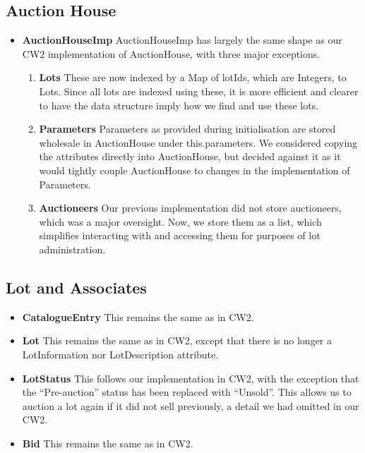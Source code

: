\documentclass[titlepage, 12pt]{extarticle}
\begin{document}
\subsection{Auction House}
\begin{itemize}
    \item {\bf AuctionHouseImp} AuctionHouseImp has largely the same shape as
        our CW2 implementation of AuctionHouse, with three major exceptions.
        \begin{enumerate}
            \item {\bf Lots} These are now indexed by a Map of lotIds, which are
                Integers, to Lots. Since all lots are indexed using these, it is
                more efficient and clearer to have the data structure imply how
                we find and use these lots.
            \item {\bf Parameters} Parameters as provided during initialisation
                are stored wholesale in AuctionHouse under this.parameters. We
                considered copying the attributes directly into AuctionHouse,
                but decided against it as it would tightly couple AuctionHouse
                to changes in the implementation of Parameters.
            \item {\bf Auctioneers} Our previous implementation did not store
                auctioneers, which was a major oversight. Now, we store them as
                a list, which simplifies interacting with and accessing them for
                purposes of lot administration.
        \end{enumerate}
\end{itemize}
\subsection{Lot and Associates}
\begin{itemize}
    \item {\bf CatalogueEntry} This remains the same as in CW2.
    \item {\bf Lot} This remains the same as in CW2, except that there is no
        longer a LotInformation nor LotDescription attribute. 
    \item {\bf LotStatus} This follows our implementation in CW2, with the
        exception that the ``Pre-auction'' status has been replaced with
        ``Unsold''. This allows us to auction a lot again if it did not sell
        previously, a detail we had omitted in our CW2. 
    \item {\bf Bid} This remains the same as in CW2.
\end{itemize}
\end{document}
